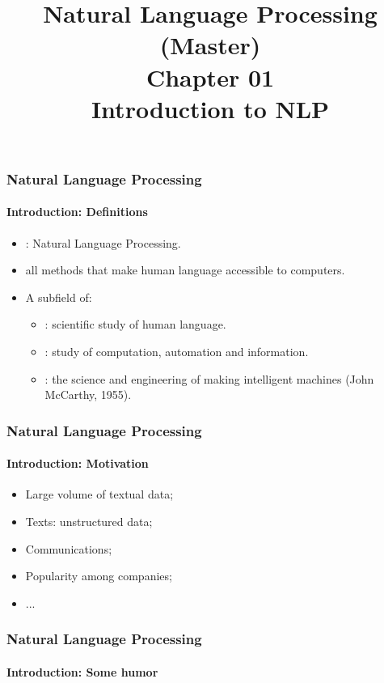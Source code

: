 \documentclass[xcolor=table]{beamer}
\title[ESI - NLP(master): 01- Introduction]%
{Natural Language Processing (Master)\\Chapter 01\\Introduction to NLP}
\begin{document}
	
\begin{frame}
\frametitle{Natural Language Processing}
\framesubtitle{Introduction: Definitions}

\begin{itemize}
	\item {}: Natural Language Processing.
	\item all methods that make human language accessible to computers.
\end{itemize}
\begin{minipage}{0.78\textwidth}
\begin{itemize}
	\item A subfield of:
	\begin{itemize}
		\item {}: scientific study of human language.
		\item {}: study of computation, automation and information.
		\item {}: the science and engineering of
		making intelligent machines (John McCarthy, 1955).
	\end{itemize}
\end{itemize}
\end{minipage}
\begin{minipage}{0.20\textwidth}
\end{minipage}
\end{frame}

\begin{frame}
\frametitle{Natural Language Processing}
\framesubtitle{Introduction: Motivation}

\begin{itemize}
	\item Large volume of textual data;
	
	\item Texts: unstructured data;
	
	\item Communications;
	
	\item Popularity among companies;
	
	\item ...
\end{itemize}

\end{frame}

\begin{frame}
\frametitle{Natural Language Processing}
\framesubtitle{Introduction: Some humor}

\begin{center}
\end{center}

\end{frame}
\end{document}
